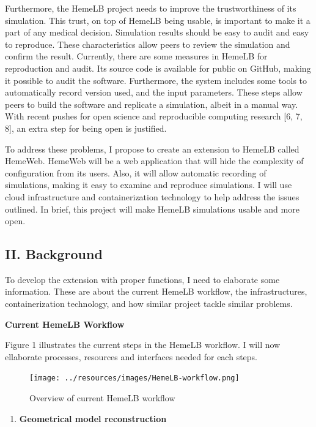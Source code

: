 \documentclass[]{article}
\providecommand{\tightlist}{%
  \setlength{\itemsep}{0pt}\setlength{\parskip}{0pt}}
\begin{document}
Furthermore, the HemeLB project needs to improve the trustworthiness of
its simulation. This trust, on top of HemeLB being usable, is important
to make it a part of any medical decision. Simulation results should be
easy to audit and easy to reproduce. These characteristics allow peers
to review the simulation and confirm the result. Currently, there are
some measures in HemeLB for reproduction and audit. Its source code is
available for public on GitHub, making it possible to audit the
software. Furthermore, the system includes some tools to automatically
record version used, and the input parameters. These steps allow peers
to build the software and replicate a simulation, albeit in a manual
way. With recent pushes for open science and reproducible computing
research {[}6, 7, 8{]}, an extra step for being open is justified.

To address these problems, I propose to create an extension to HemeLB
called HemeWeb. HemeWeb will be a web application that will hide the
complexity of configuration from its users. Also, it will allow
automatic recording of simulations, making it easy to examine and
reproduce simulations. I will use cloud infrastructure and
containerization technology to help address the issues outlined. In
brief, this project will make HemeLB simulations usable and more open.

\subsection{II. Background}\label{ii.-background}

To develop the extension with proper functions, I need to elaborate some
information. These are about the current HemeLB workflow, the
infrastructures, containerization technology, and how similar project
tackle similar problems.

\textbf{Current HemeLB Workflow}

Figure 1 illustrates the current steps in the HemeLB workflow. I will
now ellaborate processes, resources and interfaces needed for each
steps.

\begin{figure}[H]
\centering
\texttt{[image: ../resources/images/HemeLB-workflow.png]}
\caption{Overview of current HemeLB workflow}
\end{figure}

\begin{enumerate}
\def\labelenumi{\arabic{enumi}.}
\tightlist
\item
  \textbf{Geometrical model reconstruction}
\end{enumerate}
\end{document}
